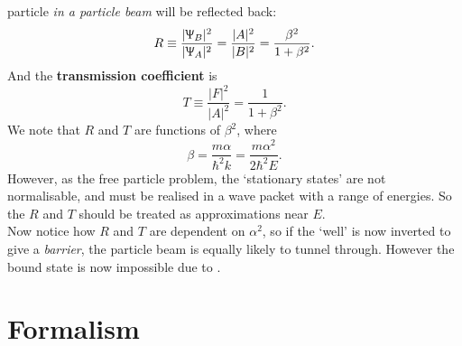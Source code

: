 particle \textit{in a particle beam} will be reflected back: 
\begin{equation}
R\equiv\frac{|\Uppsi_B|^2}{|\Uppsi_A|^2}=\frac{|A|^2}{|B|^2}=\frac{\beta^2}{1+\beta^2}.
\end{equation}
And the \textbf{transmission coefficient} is 
\begin{equation}
T\equiv\frac{|F|^2}{|A|^2}=\frac{1}{1+\beta^2}.
\end{equation}
We note that $R$ and $T$ are functions of $\beta^2$, where 
\begin{equation}
\beta=\frac{m\alpha}{\hbar^2k}=\frac{m\alpha^2}{2\hbar^2E}.
\end{equation}
However, as the free particle problem, the `stationary states' are not normalisable, and must be realised in a wave packet with a range of energies. 
So the $R$ and $T$ should be treated as approximations near $E$. \\
Now notice how $R$ and $T$ are dependent on $\alpha^2$, so if the `well' 
is now inverted to give a \textit{barrier}, the particle beam is equally likely 
to tunnel through. However the bound state is now impossible due to . 

\section{Formalism}
